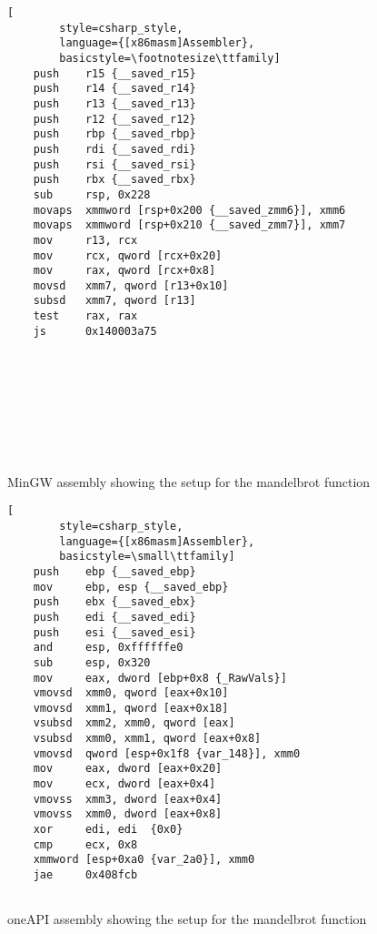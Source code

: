 \begin{figure}[ht]
    \begin{minipage}[b]{0.5\linewidth}
    \begin{lstlisting}[
        style=csharp_style,
        language={[x86masm]Assembler},
        basicstyle=\footnotesize\ttfamily]
    push    r15 {__saved_r15}
    push    r14 {__saved_r14}
    push    r13 {__saved_r13}
    push    r12 {__saved_r12}
    push    rbp {__saved_rbp}
    push    rdi {__saved_rdi}
    push    rsi {__saved_rsi}
    push    rbx {__saved_rbx}
    sub     rsp, 0x228
    movaps  xmmword [rsp+0x200 {__saved_zmm6}], xmm6
    movaps  xmmword [rsp+0x210 {__saved_zmm7}], xmm7
    mov     r13, rcx
    mov     rcx, qword [rcx+0x20]
    mov     rax, qword [rcx+0x8]
    movsd   xmm7, qword [r13+0x10]
    subsd   xmm7, qword [r13]
    test    rax, rax
    js      0x140003a75
        




    

    
    \end{lstlisting}
    \caption{MinGW assembly showing the setup for the mandelbrot function}
    \label{fig:assembly1}
    \end{minipage}
    \hspace{0.5cm}
    \begin{minipage}[b]{0.5\linewidth}
    \begin{lstlisting}[
        style=csharp_style,
        language={[x86masm]Assembler},
        basicstyle=\small\ttfamily]
    push    ebp {__saved_ebp}
    mov     ebp, esp {__saved_ebp}
    push    ebx {__saved_ebx}
    push    edi {__saved_edi}
    push    esi {__saved_esi}
    and     esp, 0xffffffe0
    sub     esp, 0x320
    mov     eax, dword [ebp+0x8 {_RawVals}]
    vmovsd  xmm0, qword [eax+0x10]
    vmovsd  xmm1, qword [eax+0x18]
    vsubsd  xmm2, xmm0, qword [eax]
    vsubsd  xmm0, xmm1, qword [eax+0x8]
    vmovsd  qword [esp+0x1f8 {var_148}], xmm0
    mov     eax, dword [eax+0x20]
    mov     ecx, dword [eax+0x4]
    vmovss  xmm3, dword [eax+0x4]
    vmovss  xmm0, dword [eax+0x8]
    xor     edi, edi  {0x0}
    cmp     ecx, 0x8
    xmmword [esp+0xa0 {var_2a0}], xmm0
    jae     0x408fcb
        
    \end{lstlisting}
    \caption{oneAPI assembly showing the setup for the mandelbrot function}
    \label{fig:assembly2}
    \end{minipage}
\end{figure}

